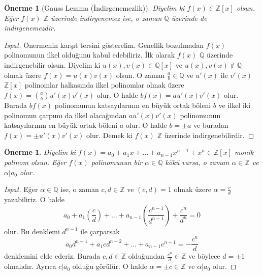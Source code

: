 \documentclass[draft]{article}
\newtheorem{prop}[thm]{Önerme}
\theoremstyle{definition}
\theoremstyle{remark}
\begin{document}
			\begin{prop}[Gauss Lemma (İndirgenemezlik)]
			    Diyelim ki $f(x) \in \mathbb{Z}[x]$ olsun. Eğer $f(x)$ $\mathbb{Z}$ üzerinde indirgenemez ise, o zaman $\mathbb{Q}$ üzerinde de indirgenemezdir.
			\end{prop}
			
			\begin{proof}[İspat]
			    Önermenin karşıt tersini gösterelim. Genellik bozulmadan $f(x)$ polinomunun ilkel olduğunu kabul edebiliriz. İlk olarak $f(x)$ $\mathbb{Q}$ üzerinde indirgenebilir olsun. Diyelim ki $u(x), v(x) \in \mathbb{Q}[x]$ ve $u(x), v(x) \notin \mathbb{Q}$ olmak üzere $f(x) = u(x)v(x)$ olsun. O zaman $\frac{a}{b} \in \mathbb{Q}$ ve $u'(x)$ ile $v'(x)$ $\mathbb{Z}[x]$ polinomlar halkasında ilkel polinomlar olmak üzere $f(x) = (\frac{a}{b})u'(x)v'(x)$ olur. O halde $bf(x) = au'(x)v'(x)$ olur. Burada $bf(x)$ polinomunun katsayılarının en büyük ortak böleni $b$ ve ilkel iki polinomun çarpımı da ilkel olacağından $au'(x)v'(x)$ polinomunun katsayılarının en büyük ortak böleni $a$ olur. O halde $b = \pm a$ ve buradan $f(x) = \pm u'(x)v'(x)$ olur. Demek ki $f(x)$ $\mathbb{Z}$ üzerinde indirgenebilirdir.
			\end{proof}
			
			\begin{prop}
			    Diyelim ki $f(x) = a_0 + a_1x + \dots + a_{n - 1}x^{n - 1} + x^n \in \mathbb{Z}[x]$ monik polinom olsun. Eğer $f(x)$ polinomunun bir $\alpha \in \mathbb{Q}$ kökü varsa, o zaman $\alpha \in \mathbb{Z}$ ve $\alpha | a_0$ olur.
			\end{prop}
			
			\begin{proof}[İspat]
			    Eğer $\alpha \in \mathbb{Q}$ ise, o zaman $c, d \in \mathbb{Z}$ ve $(c, d) = 1$ olmak üzere $\alpha = \frac{c}{d}$ yazabiliriz. O halde
				\begin{equation*}
					a_0 + a_1(\frac{c}{d}) + \dots + a_{n - 1}(\frac{c^{n - 1}}{d^{n - 1}}) + \frac{c^n}{d^n} = 0
				\end{equation*}
				olur. Bu denklemi $d^{n - 1}$ ile çarparsak
				\begin{equation*}
					a_0d^{n - 1} + a_1cd^{n - 2} + \dots + a_{n - 1}c^{n - 1} = -\frac{c^n}{d}
				\end{equation*}
				denklemini elde ederiz. Burada $c, d \in \mathbb{Z}$ olduğundan $\frac{c^n}{d} \in \mathbb{Z}$ ve böylece $d = \pm 1$ olmalıdır. Ayrıca $c | a_0$ olduğu görülür. O halde $\alpha = \pm c \in \mathbb{Z}$ ve $\alpha | a_0$ olur.
			\end{proof}
			
\end{document}
